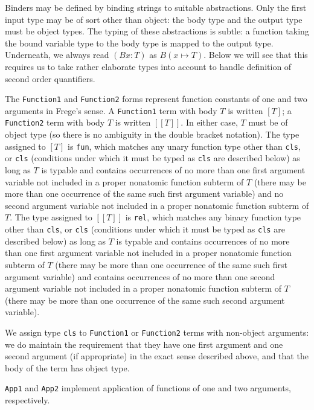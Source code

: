 \documentclass{article}
\begin{document}
{{Binders may be defined by binding strings to suitable abstractions.  Only the first input type may be of sort other than object:  the body type and the output type must be object types.  The typing of these abstractions is subtle:  a function taking the bound variable type to the body type is mapped to the output type. 
Underneath, we always read $(Bx:T)$ as $B(x \mapsto T)$.  Below we will see that this requires us to take rather elaborate types into account to handle definition of second order quantifiers.

The {\tt Function1} and {\tt Function2} forms represent function constants of one and two arguments in Frege's sense.   A {\tt Function1} term with body
$T$ is written $[T]$; a {\tt Function2} term with body $T$ is written $[[T]]$.  In either case, $T$ must be of object type (so there is no ambiguity in the double bracket notation).  The type assigned to $[T]$ is {\tt fun}, which matches any unary function type other than {\tt cls}, or {\tt cls} (conditions under which it must be typed as {\tt cls} are described below) as long as $T$ is typable and contains occurrences of no more than one first argument variable not included in a proper nonatomic function subterm of $T$ (there may be more than one occurrence of the same such first argument variable) and no second argument variable not included in a proper nonatomic function subterm of $T$.  The type assigned to $[[T]]$ is {\tt rel}, which matches any binary function type other than {\tt cls}, or {\tt cls} (conditions under which it must be typed as {\tt cls} are described below) as long as  $T$ is typable and contains occurrences of no more than one first argument variable not included in a proper nonatomic function subterm of $T$ (there may be more than one occurrence of the same such first argument variable) and contains occurrences of no more than one second argument variable not included in a proper nonatomic function subterm of $T$ (there may be more than one occurrence of the same such second argument variable).

We assign type {\tt cls} to {\tt Function1} or {\tt Function2} terms with non-object arguments:  we do maintain the requirement that they have
one first argument and one second argument (if appropriate) in the exact sense described above, and that the body of the term has object type.

{\tt App1} and {\tt App2} implement application of functions of one and two arguments, respectively.   

}}
\end{document}
